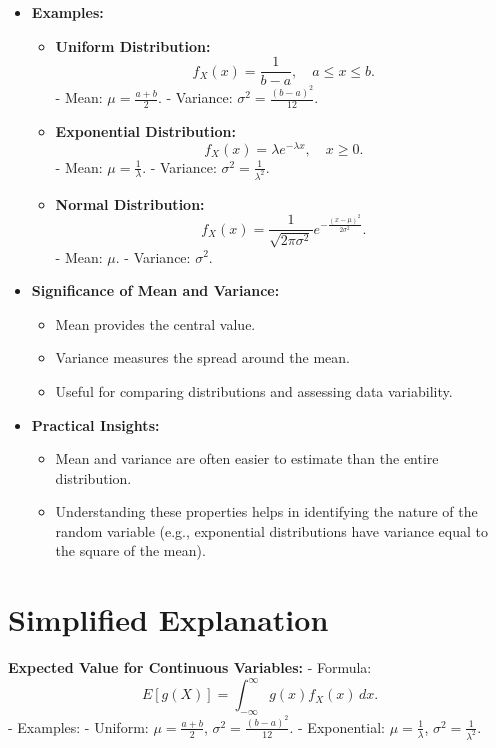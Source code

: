\documentclass{article}
\begin{document}
\begin{itemize}
  \item \textbf{Examples:}
    \begin{itemize}
      \item \textbf{Uniform Distribution:}
        \[
          f_X(x) = \frac{1}{b-a}, \quad a \leq x \leq b.
        \]
        - Mean: $\mu = \frac{a+b}{2}$.
        - Variance: $\sigma^2 = \frac{(b-a)^2}{12}$.
      \item \textbf{Exponential Distribution:}
        \[
          f_X(x) = \lambda e^{-\lambda x}, \quad x \geq 0.
        \]
        - Mean: $\mu = \frac{1}{\lambda}$.
        - Variance: $\sigma^2 = \frac{1}{\lambda^2}$.
      \item \textbf{Normal Distribution:}
        \[
          f_X(x) = \frac{1}{\sqrt{2\pi \sigma^2}} e^{-\frac{(x-\mu)^2}{2\sigma^2}}.
        \]
        - Mean: $\mu$.
        - Variance: $\sigma^2$.
    \end{itemize}

  \item \textbf{Significance of Mean and Variance:}
    \begin{itemize}
      \item Mean provides the central value.
      \item Variance measures the spread around the mean.
      \item Useful for comparing distributions and assessing data variability.
    \end{itemize}

  \item \textbf{Practical Insights:}
    \begin{itemize}
      \item Mean and variance are often easier to estimate than the entire distribution.
      \item Understanding these properties helps in identifying the nature of the random variable (e.g., exponential distributions have variance equal to the square of the mean).
    \end{itemize}
\end{itemize}

\section*{Simplified Explanation}

\textbf{Expected Value for Continuous Variables:}
- Formula:
\[
  E[g(X)] = \int_{-\infty}^\infty g(x) f_X(x) \, dx.
\]
- Examples:
- Uniform: $\mu = \frac{a+b}{2}$, $\sigma^2 = \frac{(b-a)^2}{12}$.
- Exponential: $\mu = \frac{1}{\lambda}$, $\sigma^2 = \frac{1}{\lambda^2}$.
\end{document}
